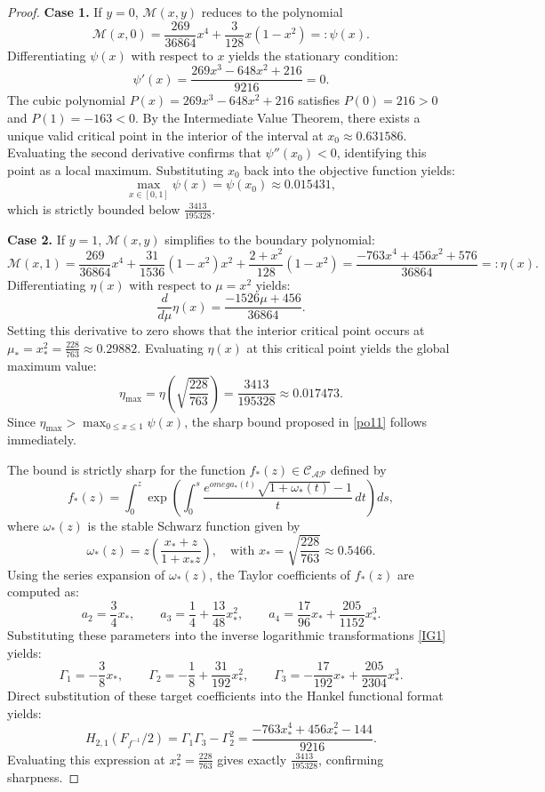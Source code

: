 \documentclass[11pt]{article}
\numberwithin{equation}{section}
\begin{document}
\begin{proof}
\medskip
\noindent\textbf{Case 1.} If $y=0$, $\mathcal{M}(x,y)$ reduces to the polynomial
\[
\mathcal{M}(x,0) = \frac{269}{36864}x^4 +\frac{3}{128}x(1-x^2) =: \psi(x).
\]
Differentiating $\psi(x)$ with respect to $x$ yields the stationary condition:
\[
\psi'(x) = \frac{269x^3 - 648x^2 + 216}{9216} = 0.
\]
The cubic polynomial $P(x) = 269x^3 - 648x^2 + 216$ satisfies $P(0) = 216 > 0$ and $P(1) = -163 < 0$. By the Intermediate Value Theorem, there exists a unique valid critical point in the interior of the interval at $x_0 \approx 0.631586$. Evaluating the second derivative confirms that $\psi''(x_0) < 0$, identifying this point as a local maximum. Substituting $x_0$ back into the objective function yields:
\[
\max_{x \in [0,1]} \psi(x) = \psi(x_0) \approx 0.015431,
\]
which is strictly bounded below $\frac{3413}{195328}$.

\medskip
\noindent\textbf{Case 2.} If $y=1$, $\mathcal{M}(x,y)$ simplifies to the boundary polynomial:
\[
\mathcal{M}(x,1) = \frac{269}{36864}x^4 +\frac{31}{1536}(1-x^2)x^2 +\frac{2+x^2}{128}(1-x^2) = \frac{-763x^4+456x^2+576}{36864} =: \eta(x).
\]
Differentiating $\eta(x)$ with respect to $\mu = x^2$ yields:
\[
\frac{d}{d\mu}\eta(x) = \frac{-1526\mu+456}{36864}.
\]
Setting this derivative to zero shows that the interior critical point occurs at $\mu_* = x_*^2 = \frac{228}{763} \approx 0.29882$. Evaluating $\eta(x)$ at this critical point yields the global maximum value:
\[
\eta_{\max} = \eta\left(\sqrt{\frac{228}{763}}\right) = \frac{3413}{195328} \approx 0.017473.
\]
Since $\eta_{\max} > \max_{0\le x\le1}\psi(x)$, the sharp bound proposed in \eqref{po11} follows immediately.

The bound is strictly sharp for the function $f_*(z) \in \mathcal{C}_{\mathcal{AP}}$ defined by
\begin{equation}\label{ext_hankel}
f_*(z) = \int_0^z \exp \left( \int_0^s \frac{e^{omega_*(t)}\sqrt{1+\omega_*(t)} - 1}{t} \, dt \right) ds,
\end{equation}
where $\omega_*(z)$ is the stable Schwarz function given by
\[
\omega_*(z) = z \left( \frac{x_* + z}{1 + x_* z} \right), \quad \text{with } x_* = \sqrt{\frac{228}{763}} \approx 0.5466.
\]
Using the series expansion of $\omega_*(z)$, the Taylor coefficients of $f_*(z)$ are computed as:
\[
a_2 = \frac{3}{4}x_*, \qquad a_3 = \frac{1}{4} + \frac{13}{48}x_*^2, \qquad a_4 = \frac{17}{96}x_* + \frac{205}{1152}x_*^3.
\]
Substituting these parameters into the inverse logarithmic transformations \eqref{IG1} yields:
\[
\Gamma_1 = -\frac{3}{8}x_*, \qquad \Gamma_2 = -\frac{1}{8} + \frac{31}{192}x_*^2, \qquad \Gamma_3 = -\frac{17}{192}x_* + \frac{205}{2304}x_*^3.
\]
Direct substitution of these target coefficients into the Hankel functional format yields:
\[
H_{2,1}\left(F_{f^{-1}}/2\right) = \Gamma_1\Gamma_3 - \Gamma_2^2 = \frac{-763x_*^4 + 456x_*^2 - 144}{9216}.
\]
Evaluating this expression at $x_*^2 = \frac{228}{763}$ gives exactly $\frac{3413}{195328}$, confirming sharpness.
\end{proof}
\end{document}
